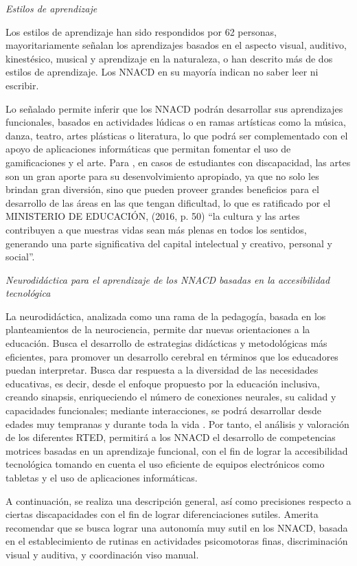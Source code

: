 \documentclass[spanish]{textolivre}
\begin{document}
\textit{Estilos de aprendizaje}

Los estilos de aprendizaje han sido respondidos por 62 personas, mayoritariamente señalan los aprendizajes basados en el aspecto visual, auditivo, kinestésico, musical y aprendizaje en la naturaleza, o han descrito más de dos estilos de aprendizaje. Los NNACD en su mayoría indican no saber leer ni escribir.

Lo señalado permite inferir que los NNACD podrán desarrollar sus aprendizajes funcionales, basados en actividades lúdicas o en ramas artísticas como la música, danza, teatro, artes plásticas o literatura, lo que podrá ser complementado con el apoyo de aplicaciones informáticas que permitan fomentar el uso de gamificaciones y el arte. Para \textcite{borja_arte_2013}, en casos de estudiantes con discapacidad, las artes son un gran aporte para su desenvolvimiento apropiado, ya que no solo les brindan gran diversión, sino que pueden proveer grandes beneficios para el desarrollo de las áreas en las que tengan dificultad, lo que es ratificado por el \textcite{ministerio_de_educacion_curriculo_2006}MINISTERIO DE EDUCACIÓN, (2016, p. 50) “la cultura y las artes contribuyen a que nuestras vidas sean más plenas en todos los sentidos, generando una parte significativa del capital intelectual y creativo, personal y social”.  

\textit{Neurodidáctica para el aprendizaje de los NNACD basadas en la accesibilidad tecnológica}

La neurodidáctica, analizada como una rama de la pedagogía, basada en los planteamientos de la neurociencia, permite dar nuevas orientaciones a la educación. Busca el desarrollo de estrategias didácticas y metodológicas más eficientes, para promover un desarrollo cerebral en términos que los educadores puedan interpretar. Busca dar respuesta a la diversidad de las necesidades educativas, es decir, desde el enfoque propuesto por la educación inclusiva, creando sinapsis, enriqueciendo el número de conexiones neurales, su calidad y capacidades funcionales; mediante interacciones, se podrá desarrollar desde edades muy tempranas y durante toda la vida \cite{paniagua_g_neurodidactica:_2013}. Por tanto, el análisis y valoración de los diferentes RTED, permitirá a los NNACD el desarrollo de competencias motrices basadas en un aprendizaje funcional, con el fin de lograr la accesibilidad tecnológica tomando en cuenta el uso eficiente de equipos electrónicos como tabletas y el uso de aplicaciones informáticas.

A continuación, se realiza una descripción general, así como precisiones respecto a ciertas discapacidades con el fin de lograr diferenciaciones sutiles. Amerita recomendar que se busca lograr una autonomía muy sutil en los NNACD, basada en el establecimiento de rutinas en actividades psicomotoras finas, discriminación visual y auditiva, y coordinación viso manual.
\end{document}
